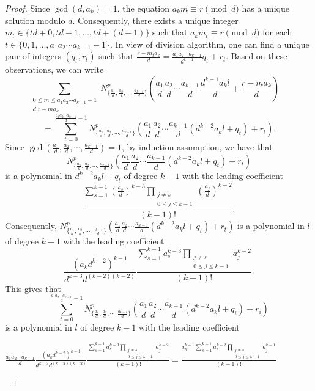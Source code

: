 \documentclass[10pt,a4paper]{amsart}
\begin{document}
\begin{proof}
Since $\gcd(d,a_k)=1$, the equation $a_km\equiv r\pmod d$ has a unique solution modulo $d$. Consequently, there exists a unique integer $m_t\in\{td+0,td+1,\ldots,td+(d-1)\}$ such that $a_km_t\equiv r\pmod d$ for each $t\in\{0,1,\ldots , a_1a_2\cdots a_{k-1}-1\}$. In view of division algorithm, one can find a unique pair of integers $(q_t,r_t)$ such that $\frac{r-m_ta_k}{d}=\frac{a_1a_2\cdots a_{k-1}}{d^{k-1}}q_t+r_t$. Based on these observations, we can write 
\[\sum_{\substack{0\leq m\leq a_1a_2\cdots a_{k-1}-1\\ d|r-ma_k}}N_{\{\frac{a_1}{d},\frac{a_2}{d},\cdots ,\frac{a_{k-1}}{d}\}}^p\left(\frac{a_1}{d}\frac{a_2}{d}\cdots \frac{a_{k-1}}{d}\frac{d^{k-1}a_kl}{d}+\frac{r-ma_k}{d}\right)\ \ \ \ \ 
\]
\[=\sum_{t=0}^{\frac{a_1a_2\cdots a_{k-1}}{d}-1}N_{\{\frac{a_1}{d},\frac{a_2}{d},\cdots ,\frac{a_{k-1}}{d}\}}^p\left(\frac{a_1}{d}\frac{a_2}{d}\cdots \frac{a_{k-1}}{d}\left(d^{k-2}a_kl+q_t\right)+r_t\right).
\]
Since $\gcd\left(\frac{a_1}{d},\frac{a_2}{d},\cdots ,\frac{a_{k-1}}{d}\right)=1$, by induction assumption, we have that 
\[
N_{\{\frac{a_1}{d},\frac{a_2}{d},\cdots ,\frac{a_{k-1}}{d}\}}^p\left(\frac{a_1}{d}\frac{a_2}{d}\cdots \frac{a_{k-1}}{d}\left(d^{k-2}a_kl+q_t\right)+r_t\right)
\]
is a polynomial in $d^{k-2}a_kl+q_t$ of degree $k-1$ with the leading coefficient 
\[\frac{\sum_{s=1}^{k-1}\left(\frac{a_s}{d}\right)^{k-3}\prod_{\substack{j\neq s\\ 0\leq j\leq k-1}}\left(\frac{a_j}{d}\right)^{k-2}}{(k-1)!}.
\]
Consequently, $N_{\{\frac{a_1}{d},\frac{a_2}{d},\cdots ,\frac{a_{k-1}}{d}\}}^p\left(\frac{a_1}{d}\frac{a_2}{d}\cdots \frac{a_{k-1}}{d}\left(d^{k-2}a_kl+q_t\right)+r_t\right)$ is a polynomial in $l$ of degree $k-1$ with the leading coefficient \[\frac{(a_kd^{k-2})^{k-1}}{d^{k-3}d^{(k-2)(k-2)}}\frac{\sum_{s=1}^{k-1}a_s^{k-3}\prod_{\substack{j\neq s\\ 0\leq j\leq k-1}}a_j^{k-2}}{(k-1)!}.\]
This gives that \[\sum_{t=0}^{\frac{a_1a_2\cdots a_{k-1}}{d}-1}N_{\{\frac{a_1}{d},\frac{a_2}{d},\cdots ,\frac{a_{k-1}}{d}\}}^p\left(\frac{a_1}{d}\frac{a_2}{d}\cdots \frac{a_{k-1}}{d}\left(d^{k-2}a_kl+q_i\right)+r_i\right)\]
is a polynomial in $l$ of degree $k-1$ with the leading coefficient 
\begin{flushleft}
$\frac{a_1a_2\cdots a_{k-1}}{d}\frac{(a_kd^{k-2})^{k-1}}{d^{k-3}d^{(k-2)(k-2)}}\frac{\sum_{s=1}^{k-1}a_s^{k-3}\prod_{\substack{j\neq s\\ 0\leq j\leq k-1}}a_j^{k-2}}{(k-1)!}
=\frac{a_k^{k-1}\sum_{s=1}^{k-1}a_s^{k-2}\prod_{\substack{j\neq s\\ 0\leq j\leq k-1}}a_j^{k-1}}{(k-1)!}$

\end{flushleft}
\end{proof}
\end{document}
